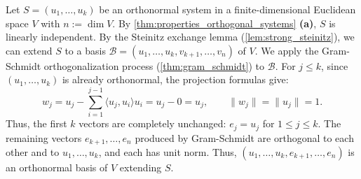 \begin{exercisesolution}
\label{sol:extend_orthonormal_system_sheet23}
Let $S = (u_1, \dots, u_k)$ be an orthonormal system in a finite-dimensional Euclidean space $V$ with $n := \dim V$.
By \cref{thm:properties_orthogonal_systems} \textbf{(a)}, $S$ is linearly independent.
By the Steinitz exchange lemma (\cref{lem:strong_steinitz}), we can extend $S$ to a basis $\mathcal{B} = (u_1, \dots, u_k, v_{k+1}, \dots, v_n)$ of $V$.
We apply the Gram-Schmidt orthogonalization process (\cref{thm:gram_schmidt}) to $\mathcal{B}$.
For $j \le k$, since $(u_1, \dots, u_k)$ is already orthonormal, the projection formulas give:
\[
w_j = u_j - \sum_{i=1}^{j-1} \langle u_j, u_i \rangle u_i = u_j - 0 = u_j, \qquad \|w_j\| = \|u_j\| = 1.
\]
Thus, the first $k$ vectors are completely unchanged: $e_j = u_j$ for $1 \le j \le k$.
The remaining vectors $e_{k+1}, \dots, e_n$ produced by Gram-Schmidt are orthogonal to each other and to $u_1, \dots, u_k$, and each has unit norm.
Thus, $(u_1, \dots, u_k, e_{k+1}, \dots, e_n)$ is an orthonormal basis of $V$ extending $S$.
\end{exercisesolution}

